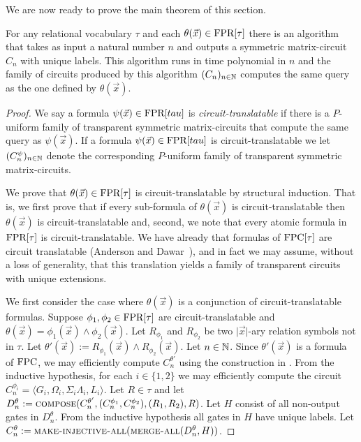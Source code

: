 \documentclass[../paper.tex]{subfiles}
\begin{document}

We are now ready to prove the main theorem of this section.

\begin{thm}
  For any relational vocabulary $\tau$ and each $\theta(\vec{x}) \in \text{\upshape FPR}[\tau]$
  there is an algorithm that takes as input a natural number $n$ and outputs a
  symmetric matrix-circuit $C_n$ with unique labels. This algorithm runs in time
  polynomial in $n$ and the family of circuits produced by this algorithm
  $(C_n)_{n \in \mathbb{N}}$ computes the same query as the one defined by
  $\theta(\vec{x})$.
\end{thm}

\begin{proof}
  We say a formula $\psi(\vec{x}) \in \text{\upshape FPR}[tau]$ is \emph{circuit-translatable}
  if there is a $P$-uniform family of transparent symmetric matrix-circuits that
  compute the same query as $\psi(\vec{x})$. If a formula $\psi(\vec{x}) \in
  \text{\upshape FPR}[tau]$ is circuit-translatable we let $(C^\psi_n)_{n \in \mathbb{N}}$ denote
  the corresponding $P$-uniform family of transparent symmetric matrix-circuits.

  We prove that $\theta(\vec{x}) \in \text{\upshape FPR}[\tau]$ is circuit-translatable by
  structural induction. That is, we first prove that if every sub-formula of
  $\theta(\vec{x})$ is circuit-translatable then $\theta(\vec{x})$ is
  circuit-translatable and, second, we note that every atomic formula in
  $\text{\upshape FPR}[\tau]$ is circuit-translatable. We have already that formulas of
  $\text{\upshape FPC}[\tau]$ are circuit translatable (Anderson and Dawar~\cite{AndersonD17}),
  and in fact we may assume, without a loss of generality, that this translation
  yields a family of transparent circuits with unique extensions.
  
  We first consider the case where $\theta(\vec{x})$ is a conjunction of
  circuit-translatable formulas. Suppose $\phi_1, \phi_2 \in \text{\upshape FPR}[\tau]$ are
  circuit-translatable and $\theta (\vec{x}) = \phi_1(\vec{x}) \land
  \phi_2(\vec{x})$. Let $R_{\phi_1}$ and $R_{\phi_2}$ be two $\vert \vec{x}
  \vert$-ary relation symbols not in $\tau$. Let $\theta' (\vec{x}) :=
  R_{\phi_1}(\vec{x}) \land R_{\phi_2}(\vec{x})$. Let $n \in \mathbb{N}$. Since
  $\theta'(\vec{x})$ is a formula of $\text{\upshape FPC}$, we may efficiently compute
  $C^{\theta'}_n$ using the construction in \cite{AndersonD17}. From the
  inductive hypothesis, for each $i \in \{1,2\}$ we may efficiently compute the
  circuit $C^{\phi_i}_n = \langle G_i, \Omega_i, \Sigma_i \Lambda_i, L_i
  \rangle$. Let $R \in \tau$ and let $D^{\theta}_n :=
  {\normalfont\textsc{compose}}(C^{\theta'}_n, (C^{\phi_1}_n, C^{\phi_2}_n), (R_1, R_2), R)$. Let
  $H$ consist of all non-output gates in $D^{\theta}_n$. From the inductive
  hypothesis all gates in $H$ have unique labels. Let $C^{\theta}_n :=
  {\normalfont\textsc{make-injective-all}}({\normalfont\textsc{merge-all}}(D^{\theta}_n, H))$.
  

\end{proof}
\end{document}
